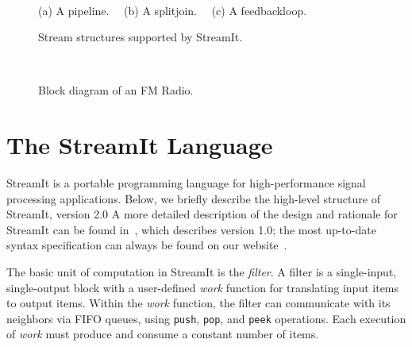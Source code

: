 \begin{figure}[t]
\begin{minipage}{3.5in}
\begin{minipage}{0.46in}
\centering
{} \\
\end{minipage} 
~
\begin{minipage}{1.3in}
\centering
{} \\
\end{minipage}
\begin{minipage}{1.02in}
\centering
{} \\
\end{minipage} 
\\ ~ \\ {\protect\small (a) A pipeline. ~~(b) A splitjoin. ~~(c) A feedbackloop.}
\caption{\protect\small Stream structures supported by StreamIt.
\protect\label{fig:structures}}
\end{minipage}
~~
\begin{minipage}{3in}
\hspace{0.1in}
\vspace{-20pt}
\caption{\protect\small Block diagram of an FM Radio.
\protect\label{fig:radio-ascoded}}
\end{minipage}
\end{figure}

\section{The StreamIt Language}
\label{sec:streamit}

StreamIt is a portable programming language for high-performance
signal processing applications.  Below, we briefly describe the
high-level structure of StreamIt, version 2.0 A more detailed
description of the design and rationale for StreamIt can be found
in~\cite{streamitcc}, which describes version 1.0; the most up-to-date
syntax specification can always be found on our
website~\cite{streamitweb}.

The basic unit of computation in StreamIt is the {\it filter}.  A
filter is a single-input, single-output block with a user-defined {\it
work} function for translating input items to output items.  Within
the {\it work} function, the filter can communicate with its neighbors
via FIFO queues, using {\tt push}, {\tt pop}, and {\tt peek}
operations.  Each execution of {\it work} must produce and consume a
constant number of items.

